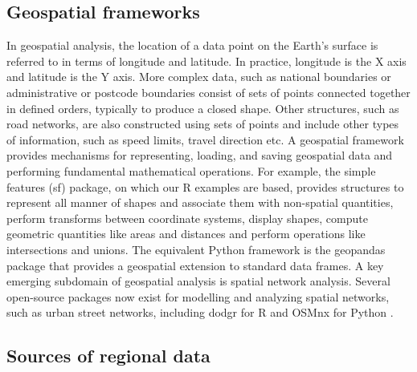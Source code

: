\documentclass[utf8]{frontiersHLTH}
\begin{document}
\subsection{Geospatial frameworks}\label{geospatial-frameworks} 
In geospatial analysis, the location of a data point on the Earth's surface is referred
to in terms of longitude and latitude. In practice, longitude is the X
axis and latitude is the Y axis. More complex data, such as national
boundaries or administrative or postcode boundaries consist of sets of
points connected together in defined orders, typically to produce a
closed shape. Other structures, such as road networks, are also
constructed using sets of points and include other types of
information, such as speed limits, travel direction etc. A geospatial
framework provides mechanisms for representing, loading, and saving
geospatial data and performing fundamental mathematical
operations. For example, the simple features (sf) \cite{Pebesma_2018}
package, on which our R examples are based, provides structures to
represent all manner of shapes and associate them with non-spatial
quantities, perform transforms between coordinate systems, display
shapes, compute geometric quantities like areas and distances and
perform operations like intersections and unions. The equivalent
Python framework is the geopandas package that provides a geospatial
extension to standard data frames. A key emerging subdomain of
geospatial analysis is spatial network analysis. Several open-source
packages now exist for modelling and analyzing spatial networks, such
as urban street networks, including dodgr for R \cite{Padgham_2019}
and OSMnx for Python \cite{boeing_osmnx_2017}.

\subsection{Sources of regional data}\label{sources-of-regional-data} 
\end{document}
